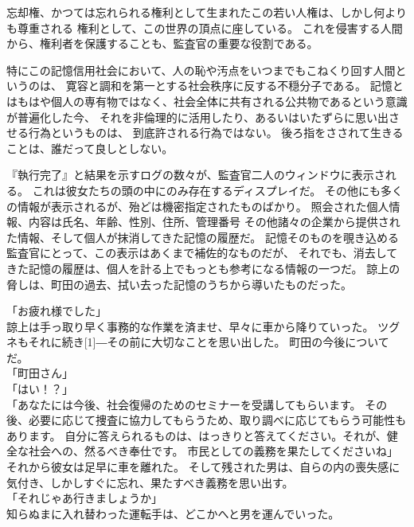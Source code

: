 \documentclass[../NenokuniMain]{subfiles}
\begin{document}
忘却権、かつては忘れられる権利として生まれたこの若い人権は、しかし何よりも尊重される
権利として、この世界の頂点に座している。
これを侵害する人間から、権利者を保護することも、監査官の重要な役割である。

特にこの記憶信用社会において、人の恥や汚点をいつまでもこねくり回す人間というのは、
寛容と調和を第一とする社会秩序に反する不穏分子である。
記憶とはもはや個人の専有物ではなく、社会全体に共有される公共物であるという意識が普遍化した今、
それを非倫理的に活用したり、あるいはいたずらに思い出させる行為というものは、
到底許される行為ではない。
後ろ指をさされて生きることは、誰だって良しとしない。

『執行完了』と結果を示すログの数々が、監査官二人のウィンドウに表示される。
これは彼女たちの頭の中にのみ存在するディスプレイだ。
その他にも多くの情報が表示されるが、殆どは機密指定されたものばかり。
照会された個人情報、内容は氏名、年齢、性別、住所、管理番号
その他諸々の企業から提供された情報、そして個人が抹消してきた記憶の履歴だ。
記憶そのものを覗き込める監査官にとって、この表示はあくまで補佐的なものだが、
それでも、消去してきた記憶の履歴は、個人を計る上でもっとも参考になる情報の一つだ。
諒上の脅しは、町田の過去、拭い去った記憶のうちから導いたものだった。

「お疲れ様でした」\\
諒上は手っ取り早く事務的な作業を済ませ、早々に車から降りていった。
ツグネもそれに続き\scalebox{2}[1]{―}その前に大切なことを思い出した。
町田の今後についてだ。\\
「町田さん」\\
「はい！？」\\
「あなたには今後、社会復帰のためのセミナーを受講してもらいます。
その後、必要に応じて捜査に協力してもらうため、取り調べに応じてもらう可能性もあります。
自分に答えられるものは、はっきりと答えてください。それが、健全な社会への、然るべき奉仕です。
市民としての義務を果たしてくださいね」\\
それから彼女は足早に車を離れた。
そして残された男は、自らの内の喪失感に気付き、しかしすぐに忘れ、果たすべき義務を思い出す。\\
「それじゃあ行きましょうか」\\
知らぬまに入れ替わった運転手は、どこかへと男を運んでいった。
\end{document}
